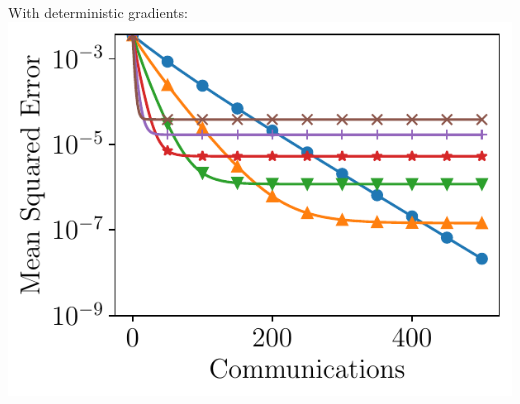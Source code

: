 \documentclass[aspectratio=169,12pt]{beamer}
\newcommand{\cmark}{\ding{51}}%
\newcommand{\xmark}{\ding{55}}%
\begin{document}
\begin{frame}[t]
\begin{minipage}{0.5\linewidth}
  \end{minipage}~%
  \begin{minipage}{0.48\linewidth}
    \pause
    \begin{center}
      \small
    With deterministic gradients:
    \includegraphics[width=0.75\linewidth]{images/local_training_heterogeneous.pdf}%
  \end{center}
  


    
    

  \end{minipage}

  \vspace{1.5em}


\end{frame}
\end{document}
